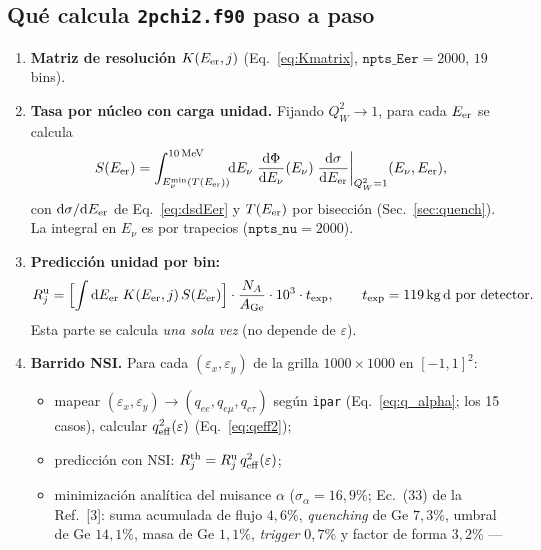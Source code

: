 \documentclass[11pt,a4paper]{article}
\newcommand{\eps}{\varepsilon}
\newcommand{\QW}{Q_{W}}
\newcommand{\Enu}{E_{\nu}}
\newcommand{\Tnr}{T}
\newcommand{\Eer}{E_{\rm er}}
\newcommand{\qeff}{q_{\rm eff}}
\newcommand{\code}[1]{\texttt{#1}}
\newcommand{\dd}{\mathrm{d}}
\newcommand{\Rth}{R^{\rm th}}
\begin{document}
\subsection{Qu\'e calcula \code{2pchi2.f90} paso a paso}
\label{sec:2pchi2}

\begin{enumerate}\itemsep3pt
  \item \textbf{Matriz de resoluci\'on} $K(\Eer, j)$ (Eq.~\eqref{eq:Kmatrix},
    $\code{npts\_Eer}=2000$, $19$ bins).
  \item \textbf{Tasa por n\'ucleo con carga unidad.} Fijando
    $\QW^{2}\!\to 1$, para cada $\Eer$ se calcula
    \begin{equation}
      \label{eq:S_Eer}
      S(\Eer)
      = \int_{\Enu^{\min}(\Tnr(\Eer))}^{\SI{10}{MeV}}\!\!\dd\Enu\;
        \frac{\dd\Phi}{\dd\Enu}(\Enu)\;
        \frac{\dd\sigma}{\dd\Eer}\bigg|_{\QW^{2}=1}(\Enu,\Eer),
    \end{equation}
    con $\dd\sigma/\dd\Eer$ de Eq.~\eqref{eq:dsdEer} y $\Tnr(\Eer)$ por
    bisecci\'on (Sec.~\ref{sec:quench}). La integral en $\Enu$ es por trapecios
    ($\code{npts\_nu}=2000$).
  \item \textbf{Predicci\'on unidad por bin:}
    \begin{equation}
      \label{eq:Runit}
      R^{\rm u}_{j}
      = \Bigl[\int \dd\Eer\; K(\Eer, j)\, S(\Eer)\Bigr]\cdot
        \frac{N_{A}}{A_{\rm Ge}}\cdot 10^{3}\cdot t_{\rm exp},
      \qquad t_{\rm exp} = \SI{119}{kg.d}\ \text{por detector}.
    \end{equation}
    Esta parte se calcula \emph{una sola vez} (no depende de $\eps$).
  \item \textbf{Barrido NSI.} Para cada $(\eps_{x},\eps_{y})$ de la grilla
    $1000\times1000$ en $[-1,1]^{2}$:
    \begin{itemize}\itemsep1pt
      \item mapear $(\eps_{x},\eps_{y})\to(q_{ee},q_{e\mu},q_{e\tau})$ seg\'un
        \code{ipar} (Eq.~\eqref{eq:q_alpha}; los 15 casos), calcular
        $\qeff^{2}(\eps)$ (Eq.~\eqref{eq:qeff2});
      \item predicci\'on con NSI: $\Rth_{j} = R^{\rm u}_{j}\,\qeff^{2}(\eps)$;
      \item minimizaci\'on anal\'itica del nuisance $\alpha$ ($\sigma_{\alpha}=
        16{,}9\%$; Ec.~(33) de la Ref.~[3]: suma acumulada de flujo $4{,}6\%$,
        \emph{quenching} de Ge $7{,}3\%$, umbral de Ge $14{,}1\%$, masa de Ge
        $1{,}1\%$, \emph{trigger} $0{,}7\%$ y factor de forma $3{,}2\%$ ---

\end{itemize}
\end{enumerate}
\end{document}
